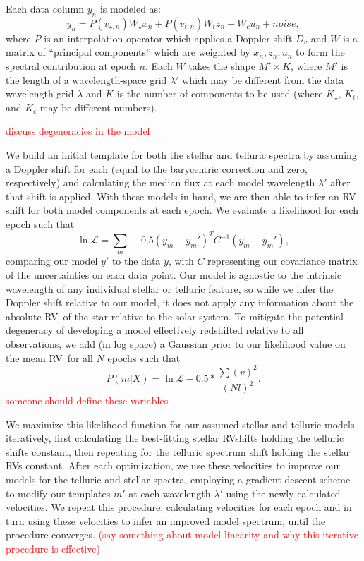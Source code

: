 \documentclass[twocolumn]{aastex62}
\newcommand{\todo}[1]{\textcolor{red}{#1}}  %
\newcommand{\acronym}[1]{{\small{#1}}}
\newcommand{\RV}{\acronym{RV}}
\begin{document}
Each data column $y_n$ is modeled as:
$$y_n = P(v_{\star, n}) W_{\star} x_n + P(v_{t, n}) W_{t} z_n + W_{c} u_n + noise,$$
where $P$ is an interpolation operator which applies a Doppler shift $D_v$ and $W$ is a matrix of ``principal components'' which are weighted by $x_n, z_n, u_n$ to form the spectral contribution at epoch $n$. Each $W$ takes the shape $M' \times K$, where $M'$ is the length of a wavelength-space grid $\lambda'$ which may be different from the data wavelength grid $\lambda$ and $K$ is the number of components to be used (where $K_{\star}$, $K_t$, and $K_c$ may be different numbers).

\todo{discuss degeneracies in the model}

We build an initial template for both the stellar and telluric spectra by assuming a Doppler shift for each (equal to the barycentric correction and zero, respectively) and calculating the median flux at each model wavelength $\lambda'$ after that shift is applied.
With these models in hand, we are then able to infer an RV shift for both model components at each epoch.
We evaluate a likelihood for each epoch such that
$$ \ln \mathcal{L} = \sum_{m} -0.5 (y_m - y_m')^T C^{-1} (y_m-y_m'),
$$
comparing our model $y'$ to the data $y$, with $C$ representing our covariance matrix of the uncertainties on each data point.
Our model is agnostic to the intrinsic wavelength of any individual stellar or telluric feature, so while we infer the  Doppler shift relative to our model, it does not apply any information about the absolute \RV\ of the star relative to the solar system. 
To mitigate the potential degeneracy of developing a model effectively redshifted relative to all observations, we add (in log space) a Gaussian prior to our likelihood value on the mean \RV\ for all $N$ epochs such that
$$ P(m|X) = \ln \mathcal{L}  -0.5 * \frac{\sum(v)^2}{(Nl)^2}.
$$
\todo{someone should define these variables}

We maximize this likelihood function for our assumed stellar and telluric models iteratively, first calculating the best-fitting stellar \RV shifts holding the telluric shifts constant, then repeating for the telluric spectrum shift holding the stellar \RV s constant.
After each optimization, we use these velocities to improve our models for the telluric and stellar spectra, employing a gradient descent scheme to modify our templates $m'$ at each wavelength $\lambda'$ using the newly calculated velocities.
We repeat this procedure, calculating velocities for each epoch and in turn using these velocities to infer an improved model spectrum, until the procedure converges. 
\todo{(say something about model linearity and why this iterative procedure is effective)}
\end{document}

